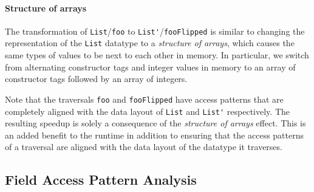 \documentclass[acmsmall,review,anonymous]{acmart}\settopmatter{printfolios=true,printccs=false,printacmref=false}
\begin{document}
\paragraph{Structure of arrays}
The transformation of
\lstinline|List|/\lstinline|foo| to \lstinline|List'|/\lstinline|fooFlipped|
is similar to
changing the representation of the \lstinline|List| datatype to a
\textit{structure of arrays}, which causes the same types of values to be next to each other in memory.
In particular, we switch from alternating constructor tags and integer values in memory to
an array of constructor tags followed by an array of integers.

Note that the traversals \lstinline|foo| and \lstinline|fooFlipped| have access
patterns that are completely aligned with the data layout of \lstinline|List| and \lstinline|List'| respectively. The resulting speedup 
is solely a consequence of the \textit{structure of arrays} effect. This is an added benefit to the runtime in addition to ensuring that the 
access patterns of a traversal are aligned with the data layout of the datatype it traverses.







\subsection{Field Access Pattern Analysis}
\label{design:fieldgraph}
\end{document}
